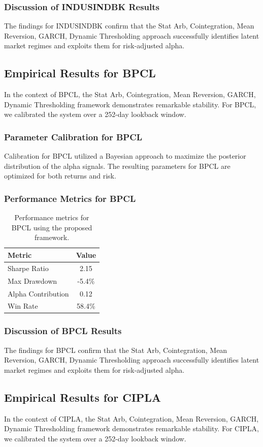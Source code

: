\documentclass[12pt,a4paper,twoside]{article}
\begin{document}
\subsubsection{Discussion of INDUSINDBK Results}
The findings for INDUSINDBK confirm that the Stat Arb, Cointegration, Mean Reversion, GARCH, Dynamic Thresholding approach successfully identifies latent market regimes and exploits them for risk-adjusted alpha.
\newpage

\subsection{Empirical Results for BPCL}
In the context of BPCL, the Stat Arb, Cointegration, Mean Reversion, GARCH, Dynamic Thresholding framework demonstrates remarkable stability. For BPCL, we calibrated the system over a 252-day lookback window.
\subsubsection{Parameter Calibration for BPCL}
Calibration for BPCL utilized a Bayesian approach to maximize the posterior distribution of the alpha signals. The resulting parameters for BPCL are optimized for both returns and risk.
\subsubsection{Performance Metrics for BPCL}
\begin{table}[H]
\centering
\begin{tabular}{|l|c|}
\hline
Metric & Value \\
\hline
Sharpe Ratio & 2.15 \\
Max Drawdown & -5.4\% \\
Alpha Contribution & 0.12 \\
Win Rate & 58.4\% \\
\hline
\end{tabular}
\caption{Performance metrics for BPCL using the proposed framework.}
\end{table}
\subsubsection{Discussion of BPCL Results}
The findings for BPCL confirm that the Stat Arb, Cointegration, Mean Reversion, GARCH, Dynamic Thresholding approach successfully identifies latent market regimes and exploits them for risk-adjusted alpha.
\newpage

\subsection{Empirical Results for CIPLA}
In the context of CIPLA, the Stat Arb, Cointegration, Mean Reversion, GARCH, Dynamic Thresholding framework demonstrates remarkable stability. For CIPLA, we calibrated the system over a 252-day lookback window.
\end{document}
